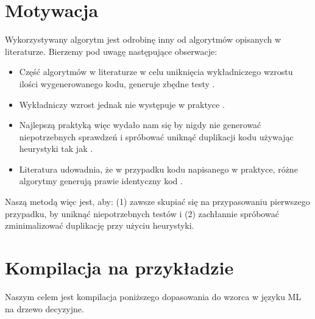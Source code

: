 \documentclass[a4paper,12pt]{book} %
\begin{document}
\section{Motywacja}
Wykorzystywany algorytm jest odrobinę inny od algorytmów opisanych w literaturze. Bierzemy pod uwagę następujące obserwacje:
\begin{itemize}
  \item Część algorytmów w literaturze w celu uniknięcia wykładniczego wzrostu ilości wygenerowanego kodu, generuje zbędne testy \cite{Augustsson__1985}.
  \item Wykładniczy wzrost jednak nie występuje w praktyce \cite{Scott__Ramsey__2000}.
  \item Najlepszą praktyką więc wydało nam się by nigdy nie generować niepotrzebnych sprawdzeń i spróbować uniknąć duplikacji kodu używając heurystyki tak jak \cite{Maranget__2008}.
  \item Literatura udowadnia, że w przypadku kodu napisanego w praktyce, różne algorytmy generują prawie identyczny kod \cite{Scott__Ramsey__2000, Maranget__2008}.
\end{itemize}
Naszą metodą więc jest, aby: (1) zawsze skupiać się na przypasowaniu pierwszego przypadku, by uniknąć niepotrzebnych testów i (2) zachłannie spróbować zminimalizować duplikację przy użyciu heurystyki.

\section{Kompilacja na przykładzie}
Naszym celem jest kompilacja poniższego dopasowania do wzorca w języku ML na drzewo decyzyjne.
\end{document}
